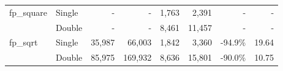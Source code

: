 \begin{table}[]
\begin{tabular}{l|l||rr||rr||rr}
\multirow{2}{*}{fp\_square} & Single                                          & -                           & -                                & 1,763                       & 2,391                            & -                       & -                       \\
                            & Double                                          & -                           & -                                & 8,461                       & 11,457                           & -                       & -                       \\ \hline \hline
\multirow{2}{*}{fp\_sqrt}   & Single                                          & 35,987                      & 66,003                           & 1,842                       & 3,360                            & -94.9\%                 & 19.64                   \\
                            & Double                                          & 85,975                      & 169,932                          & 8,636                       & 15,801                           & -90.0\%                 & 10.75
\end{tabular}

\end{table}

